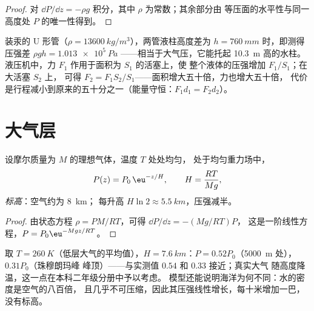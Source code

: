 \begin{proof}
对 $\dd P/\dd z = -\rho g$ 积分，其中 $\rho$ 为常数；其余部分由
等压面的水平性与同一高度处 $P$ 的唯一性得到。
\end{proof}

\begin{example}[压强计与液压机]\label{ex:b1:fluid-statics:manometer}
装汞的 U 形管（$\rho = \qty{13600}{kg/m^3}$），两管液柱高度差为
$h = \qty{760}{mm}$ 时，即测得压强差 $\rho gh = \qty{1.013e5}{Pa}$
——相当于大气压，它能托起 \qty{10.3}{m} 高的水柱。
液压机中，力 $F_1$ 作用于面积为 $S_1$ 的活塞上，使
整个液体的压强增加 $F_1/S_1$；在大活塞 $S_2$ 上，
可得 $F_2 = F_1S_2/S_1$——面积增大五十倍，力也增大五十倍，
代价是行程减小到原来的五十分之一（能量守恒：$F_1d_1 = F_2d_2$）。
\end{example}

\section{大气层}

\begin{proposition}[等温大气]\label{prop:b1:fluid-statics:atmosphere}
设摩尔质量为 $M$ 的理想气体，温度 $T$ 处处均匀，
处于均匀重力场中，
\[
P(z) = P_0\,\eu^{-z/H}, \qquad H = \frac{RT}{Mg} ,
\]
\emph{标高}：空气约为 \qty{8}{km}；
每升高 $H\ln2 \approx \qty{5.5}{km}$，压强减半。
\end{proposition}

\begin{proof}
由状态方程 $\rho = PM/RT$，可得 $\dd P/\dd z = -(Mg/RT)P$，
这是一阶线性方程，$P = P_0\eu^{-Mgz/RT}$。
\end{proof}

\begin{example}[稀薄空气]\label{ex:b1:fluid-statics:altitude}
取 $T = \qty{260}{K}$（低层大气的平均值），$H =
\qty{7.6}{km}$：$P = 0.52P_0$（\qty{5000}{m} 处），$0.31P_0$（珠穆朗玛峰
峰顶）——与实测值 $0.54$ 和 $0.33$ 接近；真实大气
随高度降温，这一点在本科二年级分册中予以考虑。
模型还能说明海洋为何不同：水的密度是空气的八百倍，
且几乎不可压缩，因此其压强线性增长，每十米增加一巴，
没有标高。
\end{example}

